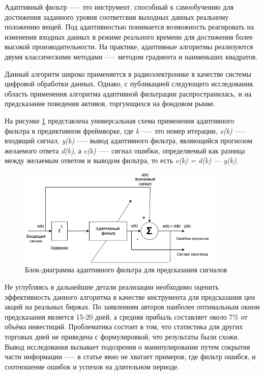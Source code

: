 \par Адаптивный фильтр —-- это инструмент, способный к самообучению для достижения заданного уровня соответсвия выходных данных реальному положению вещей. Под адаптивностью понимается возможность реагировать на изменения входных данных в режиме реального времени для достижения более высокой производительности. На практике, адаптивные алгоритмы реализуются двумя классическими методами —-- методом градиента и наименьших квадратов. 

\par Данный алгоритм широко применяется в радиоэлектронике в качестве системы цифровой обработки данных. Однако, с публикацией следующего исследования. \cite{adaptive} область применения алгоритма адаптивной фильтрации распространилась, и на предсказание поведения активов, торгующихся на фондовом рынке. 

\par На рисунке \ref{fig:adaptive} представлена универсальная схема применения адаптивного фильтра в предиктивном фреймворке, где \textit{k} —-- это номер итерации, \textit{x(k)} —-- входящий сигнал, \textit{y(k)} —-- вывод адаптивного фильтра, являющийся прогнозом желаемого ответа \textit{d(k)}, а \textit{e(k)} —-- сигнал ошибки, определяемый как разница между желаемым ответом и выводом фильтра, то есть \textit{e(k) = d(k) — y(k)}.

\begin{figure}[hbtp]
  \centering
  \includegraphics[width=0.9\textwidth]{img/adaptive.png}
  \caption{Блок-диаграмма адаптивного фильтра для предсказания сигналов}
  \label{fig:adaptive}
\end{figure}

\par Не углубляясь в дальнейшие детали реализации необходимо оценить эффективность данного алгоритма в качестве инструмента для предсказания цен акций на реальных биржах. По заявлениям авторов наиболее оптимальным окном предсказания является 15-20 дней, а средняя прибыль составляет около 7\% от объёма инвестиций. Проблематика состоит в том, что статистика для других торговых дней не приведена с формулировкой, что результаты были схожи. Вывод исследования вызывает подозрения о манипулирование путем сокрытия части информации —-- в статье явно не хватает примеров, где фильтр ошибся, и соотношение ошибок и успехов на длительном периоде.
\newpage

